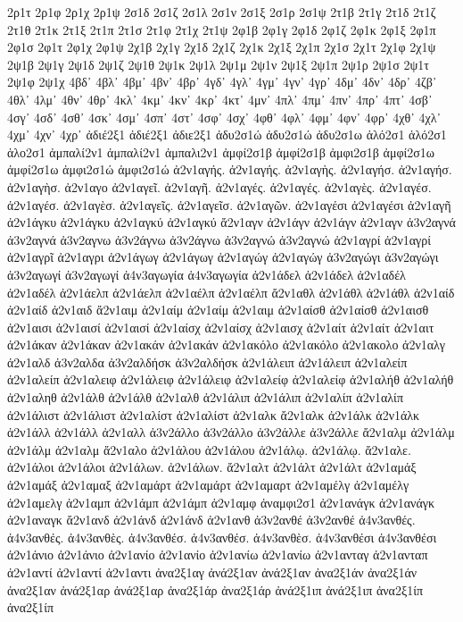 {2ρ1τ
2ρ1φ
2ρ1χ
2ρ1ψ
2σ1δ
2σ1ζ
2σ1λ
2σ1ν
2σ1ξ
2σ1ρ
2σ1ψ
2τ1β
2τ1γ
2τ1δ
2τ1ζ
2τ1θ
2τ1κ
2τ1ξ
2τ1π
2τ1σ
2τ1φ
2τ1χ
2τ1ψ
2φ1β
2φ1γ
2φ1δ
2φ1ζ
2φ1κ
2φ1ξ
2φ1π
2φ1σ
2φ1τ
2φ1χ
2φ1ψ
2χ1β
2χ1γ
2χ1δ
2χ1ζ
2χ1κ
2χ1ξ
2χ1π
2χ1σ
2χ1τ
2χ1φ
2χ1ψ
2ψ1β
2ψ1γ
2ψ1δ
2ψ1ζ
2ψ1θ
2ψ1κ
2ψ1λ
2ψ1μ
2ψ1ν
2ψ1ξ
2ψ1π
2ψ1ρ
2ψ1σ
2ψ1τ
2ψ1φ
2ψ1χ
4βδ᾽
4βλ᾽
4βμ᾽
4βν᾽
4βρ᾽
4γδ᾽
4γλ᾽
4γμ᾽
4γν᾽
4γρ᾽
4δμ᾽
4δν᾽
4δρ᾽
4ζβ᾽
4θλ᾽
4λμ᾽
4θν᾽
4θρ᾽
4κλ᾽
4κμ᾽
4κν᾽
4κρ᾽
4κτ᾽
4μν᾽
4πλ᾽
4πμ᾽
4πν᾽
4πρ᾽
4πτ᾽
4σβ᾽
4σγ᾽
4σδ᾽
4σθ᾽
4σκ᾽
4σμ᾽
4σπ᾽
4στ᾽
4σφ᾽
4σχ᾽
4φθ᾽
4φλ᾽
4φμ᾽
4φν᾽
4φρ᾽
4χθ᾽
4χλ᾽
4χμ᾽
4χν᾽
4χρ᾽
ἀδιέ2ξ1  ἀδιέ2ξ1
ἀδιε2ξ1
ἀδυ2σ1ώ  ἀδυ2σ1ώ
ἀδυ2σ1ω
ἁλό2σ1  ἁλό2σ1
ἁλο2σ1
ἀμπαλί2ν1  ἀμπαλί2ν1
ἀμπαλι2ν1
ἀμφί2σ1β  ἀμφί2σ1β
ἀμφι2σ1β
ἀμφί2σ1ω  ἀμφί2σ1ω
ἀμφι2σ1ώ  ἀμφι2σ1ώ
ἀ2ν1αγής.  ἀ2ν1αγής.
ἀ2ν1αγὴς.
ἀ2ν1αγήσ.  ἀ2ν1αγήσ.
ἀ2ν1αγὴσ.
ἀ2ν1αγο
ἀ2ν1αγεῖ.
ἀ2ν1αγῆ.
ἀ2ν1αγές.  ἀ2ν1αγές.
ἀ2ν1αγὲς.
ἀ2ν1αγέσ.  ἀ2ν1αγέσ.
ἀ2ν1αγὲσ.
ἀ2ν1αγεῖς.
ἀ2ν1αγεῖσ.
ἀ2ν1αγῶν.
ἀ2ν1αγέσι  ἀ2ν1αγέσι
ἀ2ν1αγῆ
ἀ2ν1άγκυ  ἀ2ν1άγκυ
ἀ2ν1αγκύ  ἀ2ν1αγκύ
ἄ2ν1αγν
ἀ2ν1άγν  ἀ2ν1άγν
ἀ2ν1αγν
ἀ3ν2αγνά  ἀ3ν2αγνά
ἀ3ν2αγνω
ἀ3ν2άγνω  ἀ3ν2άγνω
ἀ3ν2αγνώ  ἀ3ν2αγνώ
ἀ2ν1αγρί  ἀ2ν1αγρί
ἀ2ν1αγρῖ
ἀ2ν1αγρι
ἀ2ν1άγωγ  ἀ2ν1άγωγ
ἀ2ν1αγώγ  ἀ2ν1αγώγ
ἀ3ν2αγώγι  ἀ3ν2αγώγι
ἀ3ν2αγωγί  ἀ3ν2αγωγί
ἀ4ν3αγωγία  ἀ4ν3αγωγία
ἀ2ν1άδελ  ἀ2ν1άδελ
ἀ2ν1αδέλ  ἀ2ν1αδέλ
ἀ2ν1άελπ  ἀ2ν1άελπ
ἀ2ν1αέλπ  ἀ2ν1αέλπ
ἄ2ν1αθλ
ἀ2ν1άθλ  ἀ2ν1άθλ
ἀ2ν1αίδ  ἀ2ν1αίδ
ἀ2ν1αιδ
ἄ2ν1αιμ
ἀ2ν1αίμ  ἀ2ν1αίμ
ἀ2ν1αιμ
ἀ2ν1αίσθ  ἀ2ν1αίσθ
ἀ2ν1αισθ
ἀ2ν1αισι
ἀ2ν1αισί  ἀ2ν1αισί
ἀ2ν1αίσχ  ἀ2ν1αίσχ
ἀ2ν1αισχ
ἀ2ν1αίτ  ἀ2ν1αίτ
ἀ2ν1αιτ
ἀ2ν1άκαν  ἀ2ν1άκαν
ἀ2ν1ακάν  ἀ2ν1ακάν
ἀ2ν1ακόλο  ἀ2ν1ακόλο
ἀ2ν1ακολο
ἀ2ν1αλγ
ἀ2ν1αλδ
ἀ3ν2αλδα
ἀ3ν2αλδήσκ  ἀ3ν2αλδήσκ
ἀ2ν1άλειπ  ἀ2ν1άλειπ
ἀ2ν1αλείπ  ἀ2ν1αλείπ
ἀ2ν1αλειφ
ἀ2ν1άλειφ  ἀ2ν1άλειφ
ἀ2ν1αλείφ  ἀ2ν1αλείφ
ἀ2ν1αλήθ  ἀ2ν1αλήθ
ἀ2ν1αληθ
ἀ2ν1άλθ  ἀ2ν1άλθ
ἀ2ν1αλθ
ἀ2ν1άλιπ  ἀ2ν1άλιπ
ἀ2ν1αλίπ  ἀ2ν1αλίπ
ἀ2ν1άλιστ  ἀ2ν1άλιστ
ἀ2ν1αλίστ  ἀ2ν1αλίστ
ἀ2ν1αλκ
ἄ2ν1αλκ
ἀ2ν1άλκ  ἀ2ν1άλκ
ἀ2ν1άλλ  ἀ2ν1άλλ
ἀ2ν1αλλ
ἀ3ν2άλλο  ἀ3ν2άλλο
ἀ3ν2άλλε  ἀ3ν2άλλε
ἄ2ν1αλμ
ἀ2ν1άλμ  ἀ2ν1άλμ
ἀ2ν1αλμ
ἄ2ν1αλο
ἀ2ν1άλου  ἀ2ν1άλου
ἀ2ν1άλῳ.  ἀ2ν1άλῳ.
ἄ2ν1αλε.
ἀ2ν1άλοι  ἀ2ν1άλοι
ἀ2ν1άλων.  ἀ2ν1άλων.
ἄ2ν1αλτ
ἀ2ν1άλτ  ἀ2ν1άλτ
ἀ2ν1αμάξ  ἀ2ν1αμάξ
ἀ2ν1αμαξ
ἀ2ν1αμάρτ  ἀ2ν1αμάρτ
ἀ2ν1αμαρτ
ἀ2ν1αμέλγ  ἀ2ν1αμέλγ
ἀ2ν1αμελγ
ἀ2ν1αμπ
ἀ2ν1άμπ  ἀ2ν1άμπ
ἀ2ν1αμφ
ἀναμφι2σ1
ἀ2ν1ανάγκ  ἀ2ν1ανάγκ
ἀ2ν1αναγκ
ἄ2ν1ανδ
ἀ2ν1άνδ  ἀ2ν1άνδ
ἀ2ν1ανθ
ἀ3ν2ανθέ  ἀ3ν2ανθέ
ἀ4ν3ανθές.  ἀ4ν3ανθές.
ἀ4ν3ανθὲς.
ἀ4ν3ανθέσ.  ἀ4ν3ανθέσ.
ἀ4ν3ανθὲσ.
ἀ4ν3ανθέσι  ἀ4ν3ανθέσι
ἀ2ν1άνιο  ἀ2ν1άνιο
ἀ2ν1ανίο  ἀ2ν1ανίο
ἀ2ν1ανίω  ἀ2ν1ανίω
ἀ2ν1ανταγ
ἀ2ν1ανταπ
ἀ2ν1αντί  ἀ2ν1αντί
ἀ2ν1αντι
ἀνα2ξ1αγ
ἀνά2ξ1αν  ἀνά2ξ1αν
ἀνα2ξ1άν  ἀνα2ξ1άν
ἀνα2ξ1αν
ἀνά2ξ1αρ  ἀνά2ξ1αρ
ἀνα2ξ1άρ  ἀνα2ξ1άρ
ἀνά2ξ1ιπ  ἀνά2ξ1ιπ
ἀνα2ξ1ίπ  ἀνα2ξ1ίπ
}
